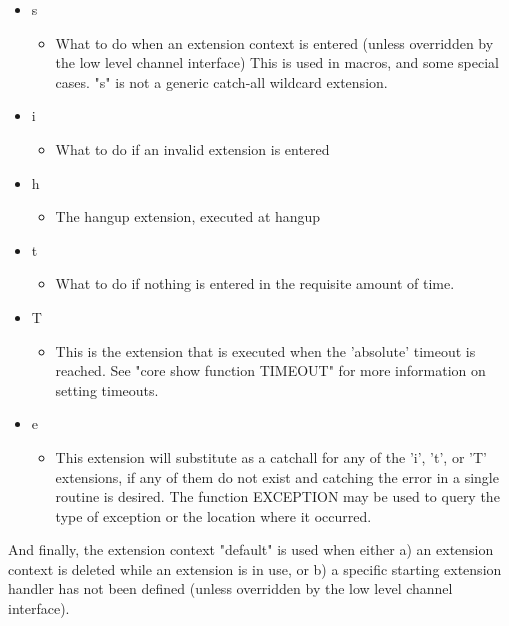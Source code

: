 \begin{itemize}
  \item s	
  \begin{itemize}
    \item What to do when an extension context is entered (unless
          overridden by the low level channel interface)
          This is used in macros, and some special cases.
          "s" is not a generic catch-all wildcard extension.
  \end{itemize}
  \item i
  \begin{itemize}
    \item What to do if an invalid extension is entered
  \end{itemize}
  \item h
  \begin{itemize}
    \item The hangup extension, executed at hangup
  \end{itemize}
  \item t
  \begin{itemize}
    \item What to do if nothing is entered in the requisite amount
          of time.
  \end{itemize}
  \item T
  \begin{itemize}
    \item This is the extension that is executed when the 'absolute'
          timeout is reached.  See "core show function TIMEOUT" for more
          information on setting timeouts.	
  \end{itemize}
  \item e
  \begin{itemize}
    \item This extension will substitute as a catchall for any of the
          'i', 't', or 'T' extensions, if any of them do not exist and
          catching the error in a single routine is desired.  The
          function EXCEPTION may be used to query the type of exception
          or the location where it occurred.
  \end{itemize}
\end{itemize}

And finally, the extension context "default" is used when either a) an
extension context is deleted while an extension is in use, or b) a specific
starting extension handler has not been defined (unless overridden by the
low level channel interface).
